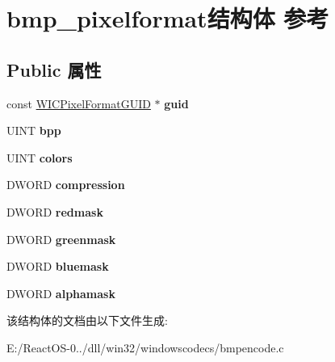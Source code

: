 \hypertarget{structbmp__pixelformat}{}\section{bmp\+\_\+pixelformat结构体 参考}
\label{structbmp__pixelformat}
\subsection*{Public 属性}
\begin{DoxyCompactItemize}
\item 
\mbox{\label{structbmp__pixelformat_abcfdfb6676e0a59e8a798e2fd84d4238}} 
const \hyperlink{interface_g_u_i_d}{W\+I\+C\+Pixel\+Format\+G\+U\+ID} $\ast$ {\bfseries guid}
\item 
\mbox{\label{structbmp__pixelformat_abc1593ee3a77e45d8a6c17e35c1460fa}} 
U\+I\+NT {\bfseries bpp}
\item 
\mbox{\label{structbmp__pixelformat_a40dd665cf45148b538dee5b1f87eb5be}} 
U\+I\+NT {\bfseries colors}
\item 
\mbox{\label{structbmp__pixelformat_aa3c0adebbf7393cd9a0c3e538c24f705}} 
D\+W\+O\+RD {\bfseries compression}
\item 
\mbox{\label{structbmp__pixelformat_a100ddfab79361ecd91513d5ff1a66340}} 
D\+W\+O\+RD {\bfseries redmask}
\item 
\mbox{\label{structbmp__pixelformat_ab9c373179a55ad56768639666e39c1f6}} 
D\+W\+O\+RD {\bfseries greenmask}
\item 
\mbox{\label{structbmp__pixelformat_ae58379308f1bf7108645558fd8bf5017}} 
D\+W\+O\+RD {\bfseries bluemask}
\item 
\mbox{\label{structbmp__pixelformat_abb0ada513de2a44b518a409df74a4ec1}} 
D\+W\+O\+RD {\bfseries alphamask}
\end{DoxyCompactItemize}


该结构体的文档由以下文件生成\+:\begin{DoxyCompactItemize}
\item 
E\+:/\+React\+O\+S-\/0../dll/win32/windowscodecs/bmpencode.\+c\end{DoxyCompactItemize}
